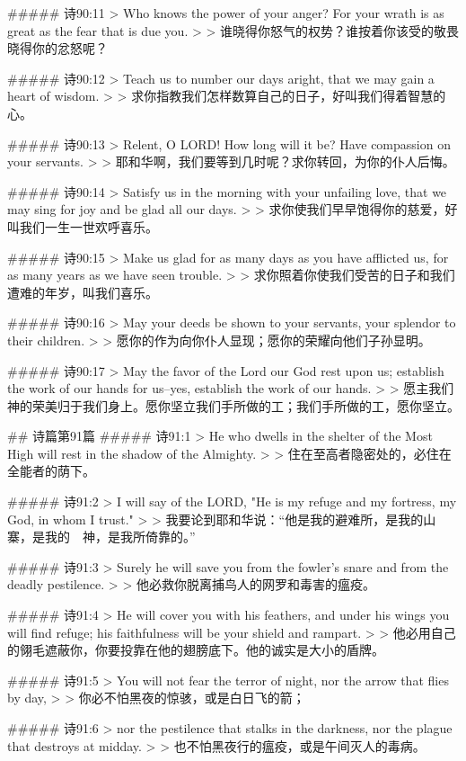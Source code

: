 ##### 诗90:11
> Who knows the power of your anger? For your wrath is as great as the fear that is due you.
>
> 谁晓得你怒气的权势？谁按着你该受的敬畏晓得你的忿怒呢？


##### 诗90:12
> Teach us to number our days aright, that we may gain a heart of wisdom.
>
> 求你指教我们怎样数算自己的日子，好叫我们得着智慧的心。


##### 诗90:13
> Relent, O LORD! How long will it be? Have compassion on your servants.
>
> 耶和华啊，我们要等到几时呢？求你转回，为你的仆人后悔。


##### 诗90:14
> Satisfy us in the morning with your unfailing love, that we may sing for joy and be glad all our days.
>
> 求你使我们早早饱得你的慈爱，好叫我们一生一世欢呼喜乐。


##### 诗90:15
> Make us glad for as many days as you have afflicted us, for as many years as we have seen trouble.
>
> 求你照着你使我们受苦的日子和我们遭难的年岁，叫我们喜乐。


##### 诗90:16
> May your deeds be shown to your servants, your splendor to their children.
>
> 愿你的作为向你仆人显现；愿你的荣耀向他们子孙显明。


##### 诗90:17
> May the favor of the Lord our God rest upon us; establish the work of our hands for us--yes, establish the work of our hands.
>
> 愿主我们　神的荣美归于我们身上。愿你坚立我们手所做的工；我们手所做的工，愿你坚立。


## 诗篇第91篇
##### 诗91:1
> He who dwells in the shelter of the Most High will rest in the shadow of the Almighty.
>
> 住在至高者隐密处的，必住在全能者的荫下。


##### 诗91:2
> I will say of the LORD, "He is my refuge and my fortress, my God, in whom I trust."
>
> 我要论到耶和华说：“他是我的避难所，是我的山寨，是我的　神，是我所倚靠的。”


##### 诗91:3
> Surely he will save you from the fowler's snare and from the deadly pestilence.
>
> 他必救你脱离捕鸟人的网罗和毒害的瘟疫。


##### 诗91:4
> He will cover you with his feathers, and under his wings you will find refuge; his faithfulness will be your shield and rampart.
>
> 他必用自己的翎毛遮蔽你，你要投靠在他的翅膀底下。他的诚实是大小的盾牌。


##### 诗91:5
> You will not fear the terror of night, nor the arrow that flies by day,
>
> 你必不怕黑夜的惊骇，或是白日飞的箭；


##### 诗91:6
> nor the pestilence that stalks in the darkness, nor the plague that destroys at midday.
>
> 也不怕黑夜行的瘟疫，或是午间灭人的毒病。


